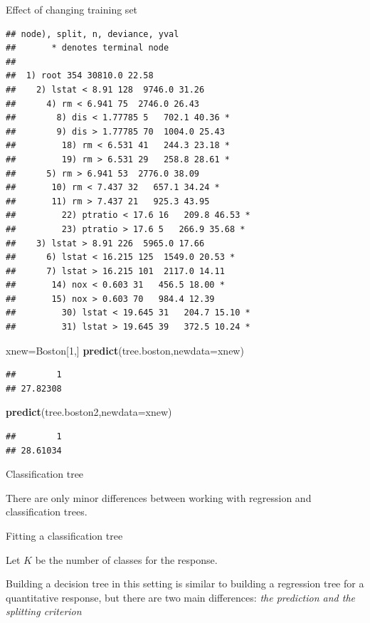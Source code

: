 \documentclass[
  ignorenonframetext,
]{beamer}
\newenvironment{Shaded}{\begin{snugshade}}{\end{snugshade}}
\newcommand{\DataTypeTok}[1]{\textcolor[rgb]{0.13,0.29,0.53}{#1}}
\newcommand{\DecValTok}[1]{\textcolor[rgb]{0.00,0.00,0.81}{#1}}
\newcommand{\KeywordTok}[1]{\textcolor[rgb]{0.13,0.29,0.53}{\textbf{#1}}}
\newcommand{\NormalTok}[1]{#1}
\begin{document}
\begin{frame}[fragile]
\begin{block}{Effect of changing training set}
\begin{verbatim}
## node), split, n, deviance, yval
##       * denotes terminal node
## 
##  1) root 354 30810.0 22.58  
##    2) lstat < 8.91 128  9746.0 31.26  
##      4) rm < 6.941 75  2746.0 26.43  
##        8) dis < 1.77785 5   702.1 40.36 *
##        9) dis > 1.77785 70  1004.0 25.43  
##         18) rm < 6.531 41   244.3 23.18 *
##         19) rm > 6.531 29   258.8 28.61 *
##      5) rm > 6.941 53  2776.0 38.09  
##       10) rm < 7.437 32   657.1 34.24 *
##       11) rm > 7.437 21   925.3 43.95  
##         22) ptratio < 17.6 16   209.8 46.53 *
##         23) ptratio > 17.6 5   266.9 35.68 *
##    3) lstat > 8.91 226  5965.0 17.66  
##      6) lstat < 16.215 125  1549.0 20.53 *
##      7) lstat > 16.215 101  2117.0 14.11  
##       14) nox < 0.603 31   456.5 18.00 *
##       15) nox > 0.603 70   984.4 12.39  
##         30) lstat < 19.645 31   204.7 15.10 *
##         31) lstat > 19.645 39   372.5 10.24 *
\end{verbatim}

\begin{Shaded}
\begin{Highlighting}[]
\NormalTok{xnew=Boston[}\DecValTok{1}\NormalTok{,]}
\KeywordTok{predict}\NormalTok{(tree.boston,}\DataTypeTok{newdata=}\NormalTok{xnew)}
\end{Highlighting}
\end{Shaded}

\begin{verbatim}
##        1 
## 27.82308
\end{verbatim}

\begin{Shaded}
\begin{Highlighting}[]
\KeywordTok{predict}\NormalTok{(tree.boston2,}\DataTypeTok{newdata=}\NormalTok{xnew)}
\end{Highlighting}
\end{Shaded}

\begin{verbatim}
##        1 
## 28.61034
\end{verbatim}

\end{block}

\end{frame}

\begin{frame}{Classification tree}
\protect\hypertarget{classification-tree}{}

There are only minor differences between working with regression and
classification trees.

\begin{block}{Fitting a classification tree}

Let \(K\) be the number of classes for the response.

Building a decision tree in this setting is similar to building a
regression tree for a quantitative response, but there are two main
differences: \emph{the prediction and the splitting criterion}

\end{block}

\end{frame}
\end{document}
